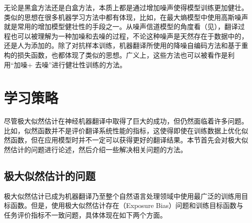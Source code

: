 \parinterval 无论是黑盒方法还是白盒方法，本质上都是通过增加噪声使得模型训练更加健壮。类似的思想在很多机器学习方法中都有体现，比如，在最大熵模型中使用高斯噪声就是常用的增加模型健壮性的手段之一。从噪声信道模型的角度看（见{\chapterfive}），翻译过程也可以被理解为一种加噪和去噪的过程，不论这种噪声是天然存在于数据中的，还是人为添加的。除了对抗样本训练，机器翻译所使用的降噪自编码方法和基于重构的损失函数，也都体现了类似的思想。广义上，这些方法也可以被看作是利用“加噪+ 去噪”进行健壮性训练的方法。


\sectionnewpage
\section{学习策略}

\parinterval 尽管极大似然估计在神经机器翻译中取得了巨大的成功，但仍然面临着许多问题。比如，似然函数并不是评价翻译系统性能的指标，这使得即使在训练数据上优化似然函数，但在应用模型时并不一定可以获得更好的翻译结果。本节首先会对极大似然估计的问题进行论述，然后介绍一些解决相关问题的方法。


\subsection{极大似然估计的问题}\label{subsec-13.3.1}

\parinterval 极大似然估计已成为机器翻译乃至整个自然语言处理领域中使用最广泛的训练用目标函数。但是，使用极大似然估计存在{\small{}}（Exposure Bias）问题和训练目标函数与任务评价指标不一致问题，具体体现在如下两个方面。

